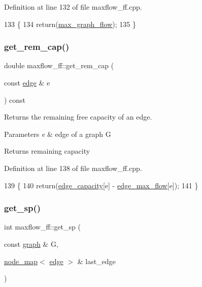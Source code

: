 Definition at line 132 of file maxflow\+\_\+ff.\+cpp.


\begin{DoxyCode}
133 \{
134     \textcolor{keywordflow}{return}(\mbox{\hyperlink{classmaxflow__ff_a7a2f530f9c95b6f37f4c349427a0f9bb}{max\_graph\_flow}});
135 \}
\end{DoxyCode}
\mbox{\label{classmaxflow__ff_a3b66acf996ff5be94de8b2cfdb3164c3}} 
\subsubsection{\texorpdfstring{get\+\_\+rem\+\_\+cap()}{get\_rem\_cap()}}
{\footnotesize\ttfamily double maxflow\+\_\+ff\+::get\+\_\+rem\+\_\+cap (\begin{DoxyParamCaption}\item[{const \mbox{\hyperlink{classedge}{edge}} \&}]{e }\end{DoxyParamCaption}) const}

Returns the remaining free capacity of an edge.


\begin{DoxyParams}{Parameters}
{\em e} & edge of a graph G \\
\hline
\end{DoxyParams}
\begin{DoxyReturn}{Returns}
remaining capacity 
\end{DoxyReturn}


Definition at line 138 of file maxflow\+\_\+ff.\+cpp.


\begin{DoxyCode}
139 \{
140     \textcolor{keywordflow}{return}(\mbox{\hyperlink{classmaxflow__ff_a5b38943e093c77a57eb70f1a4190b8a6}{edge\_capacity}}[e] - \mbox{\hyperlink{classmaxflow__ff_a669f36f1fae2dd0f6cfc0172e3ae0e8f}{edge\_max\_flow}}[e]);
141 \}
\end{DoxyCode}
\mbox{\label{classmaxflow__ff_a532b1285a791d23ab318791bc093fde7}} 
\subsubsection{\texorpdfstring{get\+\_\+sp()}{get\_sp()}}
{\footnotesize\ttfamily int maxflow\+\_\+ff\+::get\+\_\+sp (\begin{DoxyParamCaption}\item[{const \mbox{\hyperlink{classgraph}{graph}} \&}]{G,  }\item[{\mbox{\hyperlink{classnode__map}{node\+\_\+map}}$<$ \mbox{\hyperlink{classedge}{edge}} $>$ \&}]{last\+\_\+edge }\end{DoxyParamCaption})\hspace{0.3cm}{\ttfamily [protected]}}



